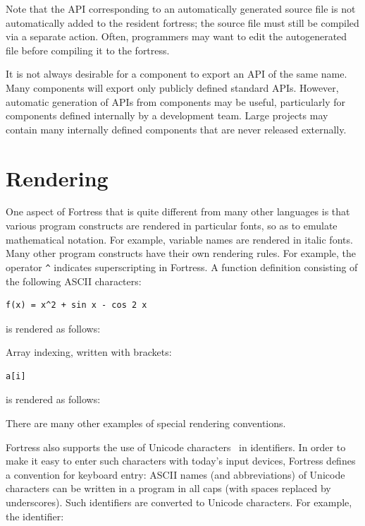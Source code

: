 Note that the API corresponding to an automatically generated source
file is not automatically added to the resident fortress; the source
file must still be compiled via a separate action. Often, programmers
may want to edit the autogenerated file before compiling it to the
fortress.

It is not always desirable for a component to export an API of the same name.
Many components will export only publicly defined standard APIs.
However, automatic generation of APIs from components may be useful,
particularly for components defined internally by a development team.
Large projects may contain many internally defined components that
are never released externally.

\section{Rendering}

One aspect of Fortress that is quite different from many other languages
is that various program constructs are rendered in particular fonts,
so as to emulate mathematical notation.
For example, variable names are rendered in italic fonts.
Many other program constructs have their own rendering rules. For
example, the operator \verb$^$ indicates superscripting in
Fortress.
A function definition consisting of the following ASCII characters:

\begin{verbatim}
f(x) = x^2 + sin x - cos 2 x
\end{verbatim}

is rendered as follows:



Array indexing, written with brackets:

\begin{verbatim}
a[i]
\end{verbatim}

is rendered as follows:



There are many other examples of special rendering conventions.

Fortress also supports the use of Unicode characters~\cite{Unicode} in
identifiers. In order to make it easy to enter such characters with
today's input devices, Fortress defines a convention for keyboard
entry: ASCII names (and abbreviations) of Unicode characters can be
written in a program in all caps (with spaces replaced by underscores).
Such identifiers are converted to Unicode characters. For example,
the identifier:

